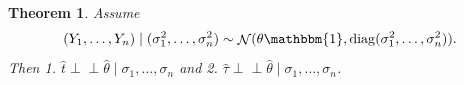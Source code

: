 \documentclass[12pt]{article}
\newtheorem{theorem}{Theorem}
\newcommand{\ind}{\perp \!\!\! \perp}
\newcommand{\y}{Y}
\renewcommand{\t}{t}
\newcommand{\thetahat}{\hat{\theta}}
\DeclareMathOperator{\diag}{diag}
\DeclareMathOperator{\N}{\mathcal{N}}
\begin{document}
\begin{theorem}\label{thrm:finite sample}
  Assume
  \begin{align}
    (\y_1,\ldots,\y_n) \mid (\sigma_1^2,\ldots,\sigma_n^2) \sim \N(\theta\mathbbm{1},\diag(\sigma_1^2,\ldots,\sigma_n^2)).
  \end{align}
  Then 1. $\hat\t \ind \thetahat \mid \sigma_1,\ldots,\sigma_n$ and 2. $\hat\tau \ind\thetahat \mid \sigma_1,\ldots,\sigma_n$.

\end{theorem}
\end{document}
